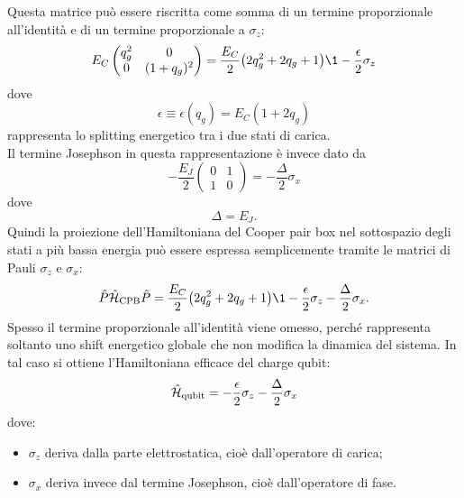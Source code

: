 Questa matrice può essere riscritta come somma di un termine proporzionale all'identità e di un termine proporzionale a $\sigma_z$:
\begin{equation*}
    E_C
    \begin{pmatrix}
        q_g^2 & 0 \\
        0 & (1+q_g)^2
    \end{pmatrix}
    =
    \frac{E_C}{2}
    \bigl(
        2q_g^2 + 2q_g + 1
    \bigr)\1
    -
    \frac{\epsilon}{2}\sigma_z
\end{equation*}
dove
\begin{equation*}
    \epsilon \equiv \epsilon(q_g)
    =
    E_C(1+2q_g)
\end{equation*}
rappresenta lo splitting energetico tra i due stati di carica.\\
Il termine Josephson in questa rappresentazione è invece dato da
\begin{equation*}
    -\frac{E_J}{2}
    \begin{pmatrix}
        0 & 1 \\
        1 & 0
    \end{pmatrix}
    =
    -\frac{\Delta}{2}\sigma_x
\end{equation*}
dove
\[
\Delta = E_J.
\]
Quindi la proiezione dell'Hamiltoniana del Cooper pair box nel sottospazio degli stati a più bassa energia può essere espressa semplicemente tramite le matrici di Pauli $\sigma_z$ e $\sigma_x$:
\begin{equation*}
    \hat{P}\hat{\mathcal{H}}_{\text{CPB}}\hat{P}
    =
    \frac{E_C}{2}
    \bigl(
        2q_g^2 + 2q_g + 1
    \bigr)\1
    -
    \frac{\epsilon}{2}\sigma_z
    -
    \frac{\Delta}{2}\sigma_x.
\end{equation*}
Spesso il termine proporzionale all'identità viene omesso, perché rappresenta soltanto uno shift energetico globale che non modifica la dinamica del sistema. In tal caso si ottiene l'Hamiltoniana efficace del charge qubit:
\begin{equation*}
    \hat{\mathcal{H}}_{\rm qubit}
    =
    - \frac{\epsilon}{2}\sigma_z
    - \frac{\Delta}{2}\sigma_x
\end{equation*}
dove:
\begin{itemize}[leftmargin=0.5cm]
    \item $\sigma_z$ deriva dalla parte elettrostatica, cioè dall'operatore di carica;
    \item $\sigma_x$ deriva invece dal termine Josephson, cioè dall'operatore di fase.
\end{itemize}
